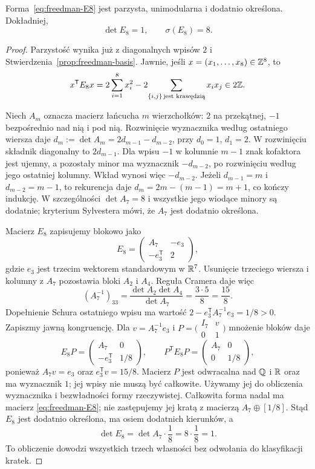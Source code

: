 \begin{stwierdzenie}
\label{prop:freedman-E8-properties}
Forma~\eqref{eq:freedman-E8} jest parzysta,
unimodularna i dodatnio określona. Dokładniej,
\[
 \det E_8=1,\qquad \sigma(E_8)=8.
\]
\end{stwierdzenie}
\begin{proof}
Parzystość wynika już z diagonalnych wpisów $2$
i Stwierdzenia~\ref{prop:freedman-basis}. Jawnie,
jeśli $x=(x_1,\ldots,x_8)\in\mathbb{Z}^8$, to
\[
 x^{\mathsf T}E_8x
 =2\sum_{i=1}^8x_i^2
       -2\!\sum_{\{i,j\}\,\text{jest krawędzią}}x_ix_j
 \in2\mathbb{Z}.
\]

Niech $A_m$ oznacza macierz łańcucha $m$ wierzchołków:
$2$ na przekątnej, $-1$ bezpośrednio nad nią i pod nią.
Rozwinięcie wyznacznika według ostatniego wiersza daje
$d_m:=\det A_m=2d_{m-1}-d_{m-2}$, przy
$d_0=1$, $d_1=2$. W rozwinięciu składnik diagonalny
to $2d_{m-1}$. Dla wpisu $-1$ w kolumnie $m-1$
znak kofaktora jest ujemny, a pozostały minor ma
wyznacznik $-d_{m-2}$, po rozwinięciu według jego
ostatniej kolumny. Wkład wynosi więc $-d_{m-2}$.
Jeżeli $d_{m-1}=m$ i $d_{m-2}=m-1$, to rekurencja
daje $d_m=2m-(m-1)=m+1$, co kończy indukcję.
W szczególności $\det A_7=8$ i wszystkie jego wiodące
minory są dodatnie; kryterium Sylvestera mówi,
że $A_7$ jest dodatnio określona.

Macierz $E_8$ zapisujemy blokowo jako
\[
 E_8=\begin{pmatrix}A_7&-e_3\\-e_3^{\mathsf T}&2\end{pmatrix},
\]
gdzie $e_3$ jest trzecim wektorem standardowym
w $\mathbb{R}^7$. Usunięcie trzeciego wiersza i kolumny
z $A_7$ pozostawia bloki $A_2$ i $A_4$.
Reguła Cramera daje więc
\[
 (A_7^{-1})_{33}
 =\frac{\det A_2\det A_4}{\det A_7}
 =\frac{3\cdot5}{8}=\frac{15}{8}.
\]
Dopełnienie Schura ostatniego wpisu ma wartość
$2-e_3^{\mathsf T}A_7^{-1}e_3=1/8>0$.
Zapiszmy jawną kongruencję. Dla
$v=A_7^{-1}e_3$ i
$P=\bigl(\begin{smallmatrix}I_7&v\\0&1\end{smallmatrix}\bigr)$
mnożenie bloków daje
\[
 E_8P=\begin{pmatrix}A_7&0\\-e_3^{\mathsf T}&1/8\end{pmatrix},
 \qquad
 P^{\mathsf T}E_8P=
 \begin{pmatrix}A_7&0\\0&1/8\end{pmatrix},
\]
ponieważ $A_7v=e_3$ oraz $e_3^{\mathsf T}v=15/8$.
Macierz $P$ jest odwracalna nad $\mathbb{Q}$ i $\mathbb{R}$ oraz ma
wyznacznik $1$; jej wpisy nie muszą być całkowite.
Używamy jej do obliczenia wyznacznika i bezwładności
formy rzeczywistej. Całkowita forma nadal ma macierz
\eqref{eq:freedman-E8}; nie zastępujemy jej kratą
z macierzą $A_7\oplus[1/8]$. Stąd $E_8$ jest dodatnio
określona, ma osiem dodatnich kierunków, a
\[
 \det E_8=\det A_7\cdot\frac18=8\cdot\frac18=1.
\]
To obliczenie dowodzi wszystkich trzech własności
bez odwołania do klasyfikacji kratek.
\end{proof}

